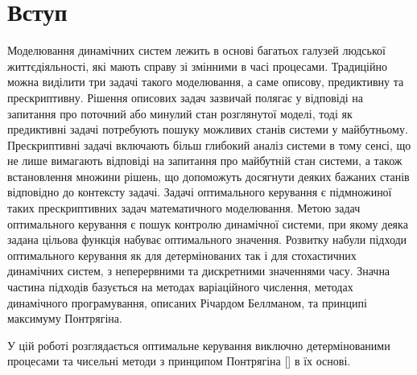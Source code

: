 \documentclass[a4paper,12pt]{extreport}
\begin{document}
\tableofcontents
\newpage 
\chapter{Вступ} 
Моделювання динамічних систем лежить в основі багатьох галузей людської життєдіяльності, 
які мають справу зі змінними в часі процесами. Традиційно можна виділити три задачі такого моделювання, а 
саме описову, предиктивну та прескриптивну. Рішення описових задач зазвичай полягає у відповіді на запитання 
про поточний або минулий стан розглянутої моделі, тоді як предиктивні задачі потребують пошуку можливих станів 
системи у майбутньому. Прескриптивні задачі включають більш глибокий аналіз системи в тому сенсі, що не лише вимагають
відповіді на запитання про майбутній стан системи, а також встановлення множини рішень, що допоможуть досягнути 
деяких бажаних станів відповідно до контексту задачі. Задачі оптимального керування є підмножиної 
таких прескриптивних задач математичного моделювання. Метою задач оптимального керування є пошук контролю 
динамічної системи, при якому деяка задана цільова функція набуває оптимального значення.
Розвитку набули підходи оптимального керування як для детермінованих так і для стохастичних динамічних систем, з неперервними 
та дискретними значеннями часу. 
Значна частина підходів базується на методах варіаційного числення, методах динамічного програмування, описаних Річардом Беллманом, та 
принципі максимуму Понтрягіна.

У цій роботі розглядається оптимальне керування виключно детермінованими процесами та чисельні методи з принципом Понтрягіна [] в їх основі.
\end{document}
